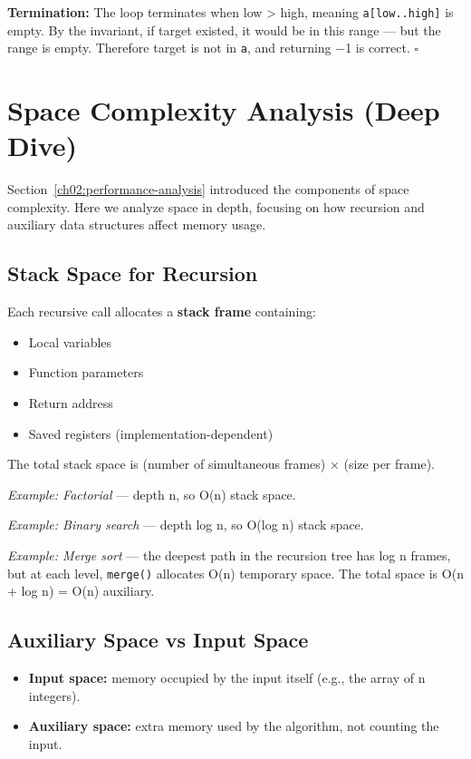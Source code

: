 \textbf{Termination:} The loop terminates when low > high, meaning \texttt{a[low..high]} is empty. By the invariant, if target existed, it would be in this range — but the range is empty. Therefore target is not in \texttt{a}, and returning $-$1 is correct. $\square$

\section{Space Complexity Analysis (Deep Dive)}

Section~\ref{ch02:performance-analysis} introduced the components of space complexity. Here we analyze space in depth, focusing on how recursion and auxiliary data structures affect memory usage.

\subsection{Stack Space for Recursion}

Each recursive call allocates a \textbf{stack frame} containing:
\begin{itemize}
\item Local variables
\item Function parameters
\item Return address
\item Saved registers (implementation-dependent)
\end{itemize}

The total stack space is (number of simultaneous frames) $\times $ (size per frame).

\textit{Example: Factorial} — depth n, so O(n) stack space.

\textit{Example: Binary search} — depth log n, so O(log n) stack space.

\textit{Example: Merge sort} — the deepest path in the recursion tree has log n frames, but at each level, \texttt{merge()} allocates O(n) temporary space. The total space is O(n + log n) = O(n) auxiliary.

\subsection{Auxiliary Space vs Input Space}

\begin{itemize}
\item \textbf{Input space:} memory occupied by the input itself (e.g., the array of n integers).
\item \textbf{Auxiliary space:} extra memory used by the algorithm, not counting the input.
\end{itemize}


